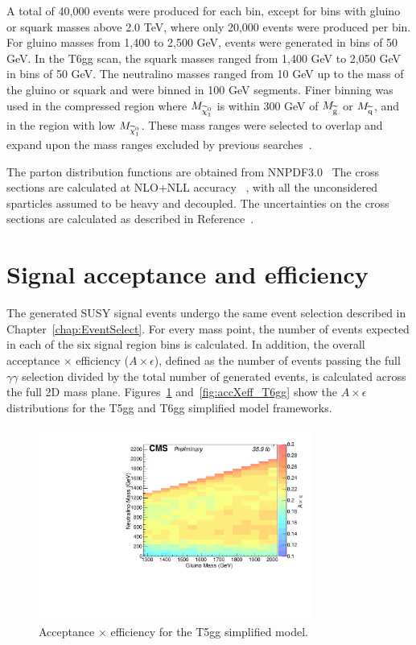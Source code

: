 A total of 40,000 events were produced for
each bin, except for bins with gluino or squark masses above 2.0 TeV, where only
20,000 events were produced per bin.
For gluino masses from 1,400 to 2,500 GeV, events were generated
in bins of 50 GeV.  In the T6gg scan, the squark masses ranged from
1,400 GeV to 2,050 GeV in bins of 50 GeV.
The neutralino masses ranged from 10 GeV up to the mass
of the gluino or squark and were binned in
100 GeV segments. Finer binning was used in the compressed region where
$M_{\widetilde{\chi}^{0}_{1}}$ is within 300 GeV of $M_{\widetilde{\mathrm{g}}}$ or $M_{\widetilde{\mathrm{q}}}$,
and in the region with low $M_{\widetilde{\chi}^{0}_{1}}$.
These mass ranges were selected to overlap and
expand upon the mass ranges excluded by previous
searches~\cite{ATLAS:2016aa,CMS:2015_anal}.

The parton distribution
functions are obtained from NNPDF3.0~\cite{Ball:2014uwa}
The cross sections are calculated at NLO+NLL accuracy
~\cite{Kulesza:2009kq, Beenakker:2009ha},
with all the unconsidered sparticles assumed to be heavy and decoupled.
The uncertainties on the cross sections are calculated as
described in Reference~\cite{Borschensky:2014cia}.



\section{Signal acceptance and efficiency}
The generated SUSY signal events undergo the same event selection described in Chapter~\ref{chap:EventSelect}. 
For every mass point, the number of events expected in each of the six signal region bins is calculated. 
In addition, the overall acceptance $\times$ efficiency ($A \times \epsilon$), defined as the number of events
passing the full $\gamma\gamma$ selection divided by the total number of generated events, is calculated across the 
full 2D mass plane. Figures~\ref{fig:accXeff_T5gg} and~\ref{fig:accXeff_T6gg} show the $A \times \epsilon$ distributions for the T5gg and T6gg simplified model 
frameworks.

\begin{figure}[h]
\begin{center}
\includegraphics[width=0.8\textwidth]{Figures/Results/accXeff_T5gg.pdf}
\end{center}
    \caption{Acceptance $\times$ efficiency for the T5gg simplified model.}
    \label{fig:accXeff_T5gg}
\end{figure}

